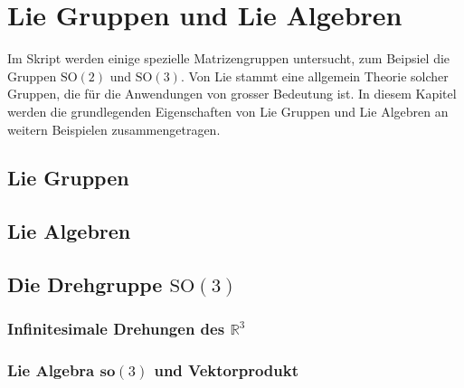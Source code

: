 %
%
%
\chapter{Lie Gruppen und Lie Algebren}
Im Skript werden einige spezielle Matrizengruppen untersucht,
zum Beipsiel die Gruppen $\textrm{SO}(2)$ und $\textrm{SO}(3)$.
Von Lie stammt eine allgemein Theorie solcher Gruppen, die für die
Anwendungen von grosser Bedeutung ist.
In diesem Kapitel werden die grundlegenden Eigenschaften von 
Lie Gruppen und Lie Algebren an weitern Beispielen zusammengetragen.

\section{Lie Gruppen}

\section{Lie Algebren}

\section{Die Drehgruppe $\textrm{SO}(3)$}

\subsection{Infinitesimale Drehungen des $\mathbb R^3$}

\subsection{Lie Algebra $\textbf{so}(3)$ und Vektorprodukt}

